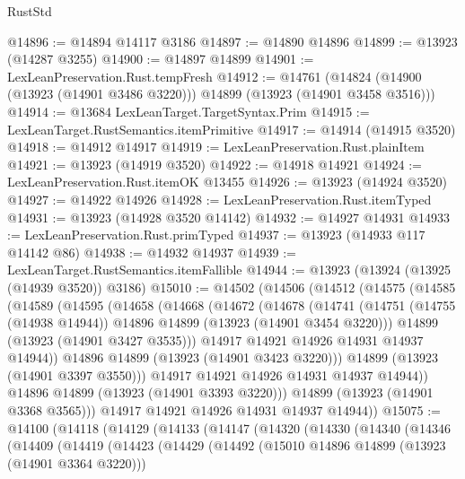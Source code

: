 \begin{lexlean}{RustStd}
\begin{coremodule}
{\begin{coremodule}
{{{{{{{{{{{{{{{{{{{{{{{{{{{{{{{{{{{{{@14896 := @14894 @14117 @3186
@14897 := @14890 @14896
@14899 := @13923 (@14287 @3255)
@14900 := @14897 @14899
@14901 := LexLeanPreservation.Rust.tempFresh
@14912 := @14761
    (@14824 (@14900 (@13923 (@14901 @3486 @3220))) @14899 (@13923 (@14901 @3458 @3516)))
@14914 := @13684 LexLeanTarget.TargetSyntax.Prim
@14915 := LexLeanTarget.RustSemantics.itemPrimitive
@14917 := @14914 (@14915 @3520)
@14918 := @14912 @14917
@14919 := LexLeanPreservation.Rust.plainItem
@14921 := @13923 (@14919 @3520)
@14922 := @14918 @14921
@14924 := LexLeanPreservation.Rust.itemOK @13455
@14926 := @13923 (@14924 @3520)
@14927 := @14922 @14926
@14928 := LexLeanPreservation.Rust.itemTyped
@14931 := @13923 (@14928 @3520 @14142)
@14932 := @14927 @14931
@14933 := LexLeanPreservation.Rust.primTyped
@14937 := @13923 (@14933 @117 @14142 @86)
@14938 := @14932 @14937
@14939 := LexLeanTarget.RustSemantics.itemFallible
@14944 := @13923 (@13924 (@13925 (@14939 @3520)) @3186)
@15010 := @14502
    (@14506
      (@14512
        (@14575
          (@14585
            (@14589
              (@14595
                (@14658
                  (@14668
                    (@14672
                      (@14678
                        (@14741
                          (@14751
                            (@14755 (@14938 @14944))
                            @14896
                            @14899
                            (@13923 (@14901 @3454 @3220)))
                          @14899
                          (@13923 (@14901 @3427 @3535)))
                        @14917
                        @14921
                        @14926
                        @14931
                        @14937
                        @14944))
                    @14896
                    @14899
                    (@13923 (@14901 @3423 @3220)))
                  @14899
                  (@13923 (@14901 @3397 @3550)))
                @14917
                @14921
                @14926
                @14931
                @14937
                @14944))
            @14896
            @14899
            (@13923 (@14901 @3393 @3220)))
          @14899
          (@13923 (@14901 @3368 @3565)))
        @14917
        @14921
        @14926
        @14931
        @14937
        @14944))
@15075 := @14100
    (@14118
      (@14129
        (@14133
          (@14147
            (@14320
              (@14330
                (@14340
                  (@14346
                    (@14409
                      (@14419
                        (@14423
                          (@14429
                            (@14492
                              (@15010 @14896 @14899 (@13923 (@14901 @3364 @3220)))
}}}}}}}}}}}}}}}}}}}}}}}}}}}}}}}}}}}}}
\end{coremodule}}
\end{coremodule}
\end{lexlean}
